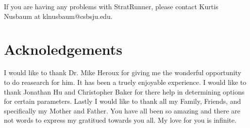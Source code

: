 \documentclass{article}
\begin{document}
If you are having any problems with StratRunner, please contact Kurtis Nusbaum at klnusbaum@csbsju.edu.

\section{Acknoledgements}

I would like to thank Dr. Mike Heroux for giving me the wonderful opportunity to do reasearch for him. It has been a truely enjoyable experience. I 
would like to thank Jonathan Hu and Christopher Baker for there help in determining options for certain parameters. Lastly I would like to thank all
my Family, Friends, and specifically my Mother and Father. You have all been so amazing and there are not words to express my gratitued towards you all.
My love for you is infinite.
\end{document}
